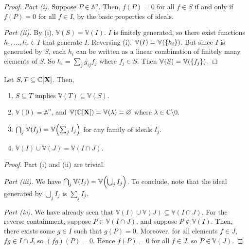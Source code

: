\begin{proof}
    \emph{Part (i).}
    Suppose \( P \in \mathbb A^n \).
    Then, \( f(P) = 0 \) for all \( f \in S \) if and only if \( f(P) = 0 \) for all \( f \in I \), by the basic properties of ideals.

    \emph{Part (ii).}
    By (i), \( \mathbb V(S) = \mathbb V(I) \).
    \( I \) is finitely generated, so there exist functions \( h_1, \dots, h_r \in I \) that generate \( I \).
    Reversing (i), \( \mathbb V(I) = \mathbb V(\qty{h_i}) \).
    But since \( I \) is generated by \( S \), each \( h_i \) can be written as a linear combination of finitely many elements of \( S \).
    So \( h_i = \sum_j g_{ij} f_j \) where \( f_j \in S \).
    Then \( \mathbb V(S) = \mathbb V(\qty{f_j}) \).
\end{proof}
\begin{proposition}
    Let \( S, T \subseteq \mathbb C[\vb X] \).
    Then,
    \begin{enumerate}
        \item \( S \subseteq T \) implies \( \mathbb V(T) \subseteq \mathbb V(S) \).
        \item \( \mathbb V(0) = \mathbb A^n \), and \( \mathbb V(\mathbb C[\vb X]) = \mathbb V(\lambda) = \varnothing \) where \( \lambda \in \mathbb C \setminus \qty{0} \).
        \item \( \bigcap_j \mathbb V(I_j) = \mathbb V\qty(\sum_j I_j) \) for any family of ideals \( I_j \).
        \item \( \mathbb V(I) \cup \mathbb V(J) = \mathbb V(I \cap J) \).
    \end{enumerate}
\end{proposition}
\begin{proof}
    Part (i) and (ii) are trivial.

    \emph{Part (iii).}
    We have \( \bigcap_j \mathbb V(I_j) = \mathbb V\qty(\bigcup_j I_j) \).
    To conclude, note that the ideal generated by \( \bigcup_j I_j \) is \( \sum_j I_j \).

    \emph{Part (iv).}
    We have already seen that \( \mathbb V(I) \cup \mathbb V(J) \subseteq \mathbb V(I \cap J) \).
    For the reverse containment, suppose \( P \in \mathbb V(I \cap J) \), and suppose \( P \not\in \mathbb V(I) \).
    Then, there exists some \( g \in I \) such that \( g(P) = 0 \).
    Moreover, for all elements \( f \in J \), \( fg \in I \cap J \), so \( (fg)(P) = 0 \).
    Hence \( f(P) = 0 \) for all \( f \in J \), so \( P \in \mathbb V(J) \).
\end{proof}

